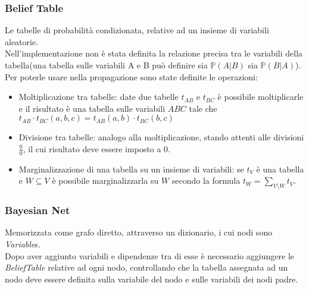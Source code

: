 \documentclass[a4paper]{article}
\begin{document}
\subsubsection{Belief Table}
Le tabelle di probabilità condizionata, relative ad un insieme di variabili aleatorie.\\
Nell'implementazione non è stata definita la relazione precisa tra le variabili della tabella(una tabella sulle variabili A e B può definire sia $\mathbb{P}(A|B)$ sia $\mathbb{P}(B|A)$).\\
Per poterle usare nella propagazione sono state definite le operazioni:
\begin{itemize}
\item Moltiplicazione tra tabelle: date due tabelle $t_{AB}$ e $t_{BC}$ è possibile moltiplicarle e il risultato è una tabella sulle variabili $ABC$ tale che $t_{AB}\cdot t_{BC}(a,b,c)=t_{AB}(a,b)\cdot t_{BC}(b,c)$
\item Divisione tra tabelle: analogo alla moltiplicazione, stando attenti alle divisioni $\frac{0}{0}$, il cui risultato deve essere imposto a 0.
\item Marginalizzazione di una tabella su un insieme di variabili: se $t_V$ è una tabella e $W\subseteq V$ è possibile marginalizzarla su $W$ secondo la formula $t_W = \sum_{V\setminus W}t_V$.
\end{itemize}
\subsubsection{Bayesian Net}
Memorizzata come grafo diretto, attraverso un dizionario, i cui nodi sono \emph{Variable}s.\\
Dopo aver aggiunto variabili e dipendenze tra di esse è necessario aggiungere le \emph{BeliefTable} relative ad ogni nodo, controllando che la tabella assegnata ad un nodo deve essere definita sulla variabile del nodo e sulle variabili dei nodi padre.
\end{document}

